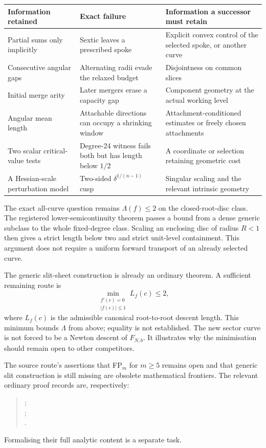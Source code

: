 \documentclass[11pt,a4paper]{article}
\theoremstyle{remark}\newtheorem{remark}[theorem]{Remark}
\begin{document}
\begin{center}\small
\begin{tabular}{p{.24\linewidth}p{.32\linewidth}p{.34\linewidth}}
\toprule
Information retained & Exact failure & Information a successor must retain\\
\midrule
Partial sums only implicitly & Sextic leaves a prescribed spoke & Explicit convex control of the selected spoke, or another curve\\
Consecutive angular gaps & Alternating radii evade the relaxed budget & Disjointness on common slices\\
Initial merge arity & Later mergers erase a capacity gap & Component geometry at the actual working level\\
Angular mean length & Attachable directions can occupy a shrinking window & Attachment-conditioned estimates or freely chosen attachments\\
Two scalar critical-value tests & Degree-24 witness fails both but has length below $1/2$ & A coordinate or selection retaining geometric cost\\
A Hessian-scale perturbation model & Two-sided $\delta^{1/(n-1)}$ cusp & Singular scaling and the relevant intrinsic geometry\\
\bottomrule
\end{tabular}
\end{center}

The exact all-curve question remains $\Lambda(f)\le2$ on the closed-root-disc
class. The registered lower-semicontinuity theorem passes a bound from a
dense generic subclass to the whole fixed-degree class. Scaling an enclosing
disc of radius $R<1$ then gives a strict length below two and strict
unit-level containment. This argument does not require a uniform forward
transport of an already selected curve.

The generic slit-sheet construction is already an ordinary theorem. A
sufficient remaining route is
\[
 \min_{\substack{f'(c)=0\\|f(c)|\le1}}L_f(c)\le2,
\]
where $L_f(c)$ is the admissible canonical root-to-root descent length.
This minimum bounds $\Lambda$ from above; equality is not established.
The new sector curve is not forced to be a Newton descent of $F_{N,b}$.
It illustrates why the minimisation should remain open to other competitors.

The source route's assertions that FP$_m$ for $m\ge5$ remains open and
that generic slit construction is still missing are obsolete mathematical
frontiers. The relevant ordinary proof records are, respectively:
\begin{quote}\small
{};\\
;\\
.
\end{quote}
Formalising their full analytic content is a separate task.
\end{document}

